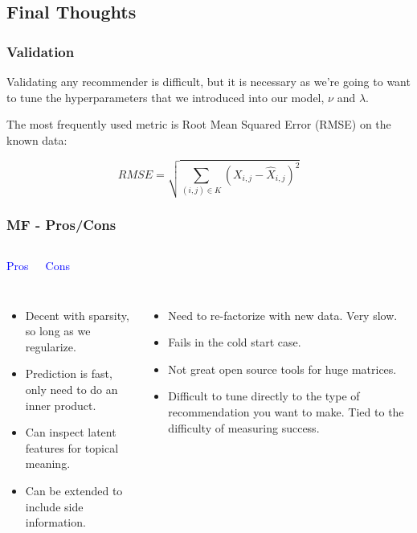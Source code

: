 \documentclass{beamer}
\begin{document}
\subsection{Final Thoughts}
\begin{frame}
  \frametitle{Validation}
  Validating any recommender is difficult, but it is necessary as we're going to want to tune the hyperparameters that we introduced into our model, $\nu$ and $\lambda$. \vspace{2mm}
  
  The most frequently used metric is Root Mean Squared Error (RMSE) on the known data:

  $$ RMSE = \sqrt{\sum\limits_{(i,j) \in K} (X_{i,j} - \hat{X}_{i,j})^2} $$
\end{frame}

\begin{frame}
  \frametitle{MF - Pros/Cons}
  \begin{columns}
    \begin{center} {\LARGE \textcolor{blue}{Pros}} \end{center}
    \begin{center} {\LARGE \textcolor{blue}{Cons}} \end{center}
  \end{columns} \vspace{4mm}
  \begin{columns}
    \begin{itemize}
      \item Decent with sparsity, so long as we regularize.
      \item Prediction is fast, only need to do an inner product.
      \item Can inspect latent features for topical meaning.
      \item Can be extended to include side information.
    \end{itemize}
    \begin{itemize}
      \item Need to re-factorize with new data. Very slow.
      \item Fails in the cold start case.
      \item Not great open source tools for huge matrices.
      \item Difficult to tune directly to the type of recommendation you want to make. Tied to the difficulty of measuring success.
    \end{itemize}
  \end{columns}
\end{frame}
\end{document}
